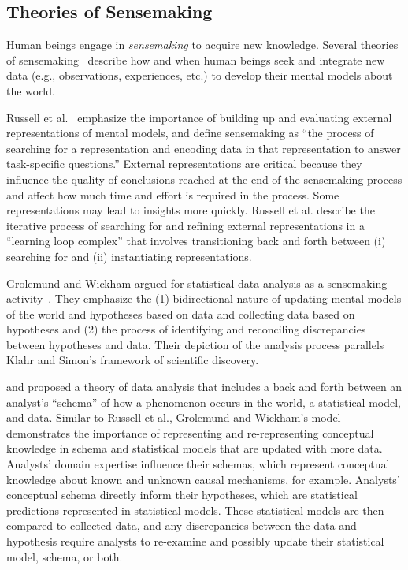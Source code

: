 \figurePriorWorkCombined

\subsection{Theories of Sensemaking}
Human beings engage in \textit{sensemaking} to acquire new knowledge. Several
theories of
sensemaking~\cite{pirolli2005sensemaking,russell1993cost,klein2007dataFrame}
describe how and when human beings seek and integrate new data (e.g.,
observations, experiences, etc.) to develop their mental models about the world.

Russell et al.~\cite{russell1993cost} emphasize the importance of building up
and evaluating external representations of mental models, and define sensemaking
as ``the process of searching for a representation and encoding data in that
representation to answer task-specific questions.'' External representations are
critical because they influence the quality of conclusions reached at the end of
the sensemaking process and affect how much time and effort is required in the process. Some representations
may lead to insights more quickly. Russell et al. describe the iterative
process of searching for and refining external representations in a ``learning
loop complex'' that involves transitioning back and forth between (i) searching
for and (ii) instantiating representations. 
 
Grolemund and Wickham argued for statistical data analysis as a sensemaking
activity~\cite{grolemund2014cognitive}. They emphasize the (1)
bidirectional nature of updating mental models of the world and hypotheses based
on data and collecting data based on hypotheses and (2) the process of
identifying and reconciling discrepancies between hypotheses and data. Their
depiction of the analysis process parallels Klahr and Simon's framework of
scientific discovery.

and proposed a theory of data
analysis that includes a back and forth between an analyst's ``schema'' of how a
phenomenon occurs in the world, a statistical model, and data. Similar to
Russell et al., Grolemund and Wickham's model demonstrates the importance of
representing and re-representing conceptual knowledge in schema and statistical
models that are updated with more data. Analysts' domain expertise influence
their schemas, which represent conceptual knowledge about known and unknown
causal mechanisms, for example. Analysts' conceptual schema directly inform
their hypotheses, which are statistical predictions represented in statistical
models. These statistical models are then compared to collected data, and any
discrepancies between the data and hypothesis require analysts to re-examine and
possibly update their statistical model, schema, or both. 

